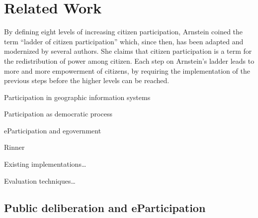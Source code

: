 \section{Related Work}
\label{chap:related_work}

By defining eight levels of increasing citizen participation, Arnstein \cite{Arnstein1969_citizen_participation} coined the term ``ladder of citizen participation'' which, since then, has been adapted and modernized \cite{Cai2009_spatial_annotation_deliberation,Connor1988_new_ladder,Collins2009_social_learning,carver2003future,you2009_participatory_map_based} by several authors. She claims that citizen participation is a term for the redistribution of power among citizen. Each step on Arnstein's ladder leads to more and more empowerment of citizens, by requiring the implementation of the previous steps before the higher levels can be reached.

Participation in geographic information systems 

Participation as democratic process

eParticipation and egovernment


Rinner\cite{Rinner_ArgumentationMaps}

Existing implementations\dots

Evaluation techniques\dots


\subsection{Public deliberation and eParticipation}

